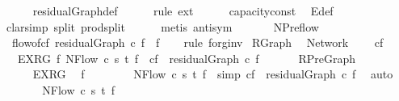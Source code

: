 \begin{isabellebody}
\ \ \ \ \isamarkupfalse%
\ residualGraph{\isacharunderscore}def\isanewline
\ \ \ \ \isamarkupfalse%
\ {\isacharparenleft}rule\ ext{\isacharparenright}\isanewline
\ \ \ \ \isamarkupfalse%
\ capacity{\isacharunderscore}const\ \isamarkupfalse%
\ E{\isacharunderscore}def\isanewline
\ \ \ \ \isamarkupfalse%
\ {\isacharparenleft}clarsimp\ split{\isacharcolon}\ prod{\isachardot}split{\isacharparenright}\isanewline
\ \ \ \ \isamarkupfalse%
\ {\isacharparenleft}metis\ antisym{\isacharparenright}%
\endisatagproof
{\isafoldproof}%
%
\isadelimproof
\isanewline
%
\endisadelimproof
\isanewline
{}\isamarkupfalse%
\ \ \ \ \isanewline
\isanewline
\isanewline
{}\isamarkupfalse%
\ {\isacharparenleft}\ NPreflow{\isacharparenright}\isanewline
\ \ {\isachardoublequoteopen}flow{\isacharunderscore}of{\isacharunderscore}cf\ {\isacharparenleft}residualGraph\ c\ f{\isacharparenright}\ {\isacharequal}\ f{\isachardoublequoteclose}\isanewline
%
\isadelimproof
\ \ %
\endisadelimproof
%
\isatagproof
{}\isamarkupfalse%
\ {\isacharparenleft}rule\ fo{\isacharunderscore}rg{\isacharunderscore}inv{\isacharparenright}%
\endisatagproof
{\isafoldproof}%
%
\isadelimproof
\isanewline
%
\endisadelimproof
\isanewline
\isanewline
{}\isamarkupfalse%
\ RGraph\ %
\isanewline
{\isacharequal}\ Network\ {\isacharplus}\isanewline
\ \ \ cf\isanewline
\ \ \ EX{\isacharunderscore}RG{\isacharcolon}\ {\isachardoublequoteopen}{\isasymexists}f{\isachardot}\ NFlow\ c\ s\ t\ f\ {\isasymand}\ cf\ {\isacharequal}\ residualGraph\ c\ f{\isachardoublequoteclose}\isanewline
{}\ \ \isanewline
\ \ \isamarkupfalse%
\ RPreGraph\ \isanewline
%
\isadelimproof
\ \ %
\endisadelimproof
%
\isatagproof
{}\isamarkupfalse%
\ \ \ \ \isanewline
\ \ \ \ \isamarkupfalse%
\ EX{\isacharunderscore}RG\ \isamarkupfalse%
\ f\ \ \isanewline
\ \ \ \ \ \ {\isachardoublequoteopen}NFlow\ c\ s\ t\ f{\isachardoublequoteclose}\ \ {\isacharbrackleft}simp{\isacharbrackright}{\isacharcolon}\ {\isachardoublequoteopen}cf\ {\isacharequal}\ residualGraph\ c\ f{\isachardoublequoteclose}\ \isamarkupfalse%
\ auto\isanewline
\ \ \ \ \isamarkupfalse%
\ \isamarkupfalse%
\ NFlow\ c\ s\ t\ f\ \isamarkupfalse%

\end{isabellebody}
